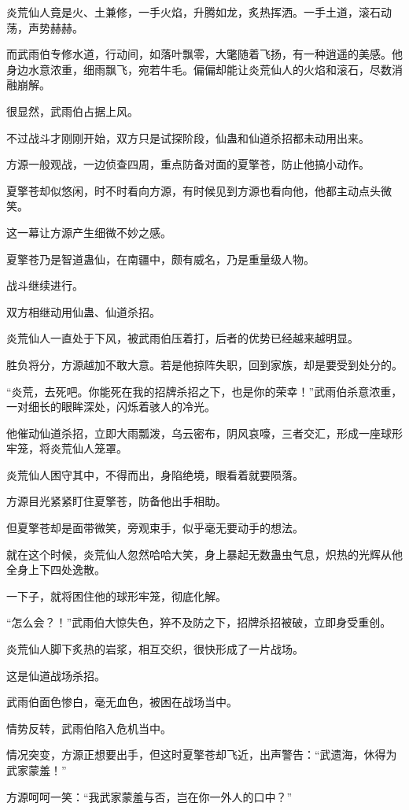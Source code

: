 \begin{this_body}
炎荒仙人竟是火、土兼修，一手火焰，升腾如龙，炙热挥洒。一手土道，滚石动荡，声势赫赫。

而武雨伯专修水道，行动间，如落叶飘零，大氅随着飞扬，有一种逍遥的美感。他身边水意浓重，细雨飘飞，宛若牛毛。偏偏却能让炎荒仙人的火焰和滚石，尽数消融崩解。

很显然，武雨伯占据上风。

不过战斗才刚刚开始，双方只是试探阶段，仙蛊和仙道杀招都未动用出来。

方源一般观战，一边侦查四周，重点防备对面的夏擎苍，防止他搞小动作。

夏擎苍却似悠闲，时不时看向方源，有时候见到方源也看向他，他都主动点头微笑。

这一幕让方源产生细微不妙之感。

夏擎苍乃是智道蛊仙，在南疆中，颇有威名，乃是重量级人物。

战斗继续进行。

双方相继动用仙蛊、仙道杀招。

炎荒仙人一直处于下风，被武雨伯压着打，后者的优势已经越来越明显。

胜负将分，方源越加不敢大意。若是他掠阵失职，回到家族，却是要受到处分的。

“炎荒，去死吧。你能死在我的招牌杀招之下，也是你的荣幸！”武雨伯杀意浓重，一对细长的眼眸深处，闪烁着骇人的冷光。

他催动仙道杀招，立即大雨瓢泼，乌云密布，阴风哀嚎，三者交汇，形成一座球形牢笼，将炎荒仙人笼罩。

炎荒仙人困守其中，不得而出，身陷绝境，眼看着就要陨落。

方源目光紧紧盯住夏擎苍，防备他出手相助。

但夏擎苍却是面带微笑，旁观束手，似乎毫无要动手的想法。

就在这个时候，炎荒仙人忽然哈哈大笑，身上暴起无数蛊虫气息，炽热的光辉从他全身上下四处逸散。

一下子，就将困住他的球形牢笼，彻底化解。

“怎么会？！”武雨伯大惊失色，猝不及防之下，招牌杀招被破，立即身受重创。

炎荒仙人脚下炙热的岩浆，相互交织，很快形成了一片战场。

这是仙道战场杀招。

武雨伯面色惨白，毫无血色，被困在战场当中。

情势反转，武雨伯陷入危机当中。

情况突变，方源正想要出手，但这时夏擎苍却飞近，出声警告：“武遗海，休得为武家蒙羞！”

方源呵呵一笑：“我武家蒙羞与否，岂在你一外人的口中？”


\end{this_body}
